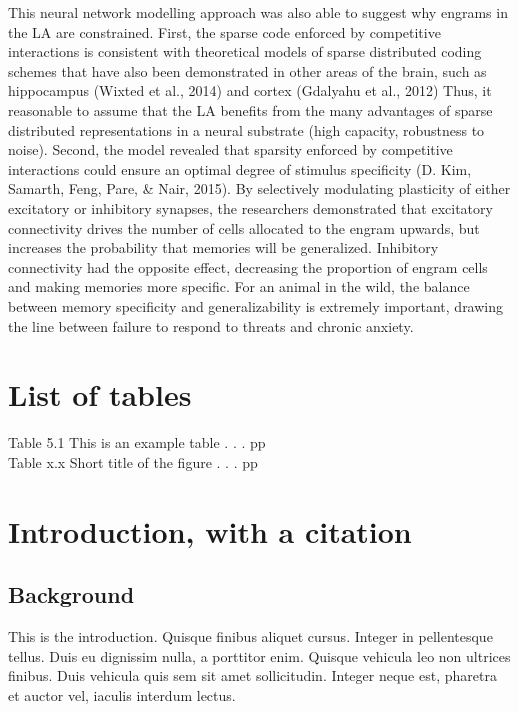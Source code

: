 \documentclass[12pt,a4paper,]{report}
\begin{document}
This neural network modelling approach was also able to suggest why
engrams in the LA are constrained. First, the sparse code enforced by
competitive interactions is consistent with theoretical models of sparse
distributed coding schemes that have also been demonstrated in other
areas of the brain, such as hippocampus (Wixted et al., 2014) and cortex
(Gdalyahu et al., 2012) Thus, it reasonable to assume that the LA
benefits from the many advantages of sparse distributed representations
in a neural substrate (high capacity, robustness to noise). Second, the
model revealed that sparsity enforced by competitive interactions could
ensure an optimal degree of stimulus specificity (D. Kim, Samarth, Feng,
Pare, \& Nair, 2015). By selectively modulating plasticity of either
excitatory or inhibitory synapses, the researchers demonstrated that
excitatory connectivity drives the number of cells allocated to the
engram upwards, but increases the probability that memories will be
generalized. Inhibitory connectivity had the opposite effect, decreasing
the proportion of engram cells and making memories more specific. For an
animal in the wild, the balance between memory specificity and
generalizability is extremely important, drawing the line between
failure to respond to threats and chronic anxiety.

\chapter*{List of tables}\label{list-of-tables}

Table 5.1 This is an example table . . . \hfill{pp}\\
Table x.x Short title of the figure . . . \hfill{pp}

\chapter{Introduction, with a
citation}\label{introduction-with-a-citation}

\section{Background}\label{background}

This is the introduction. Quisque finibus aliquet cursus. Integer in
pellentesque tellus. Duis eu dignissim nulla, a porttitor enim. Quisque
vehicula leo non ultrices finibus. Duis vehicula quis sem sit amet
sollicitudin. Integer neque est, pharetra et auctor vel, iaculis
interdum lectus.
\end{document}
